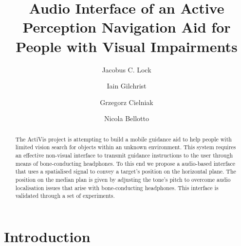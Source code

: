 \documentclass{llncs}
\begin{document}
\title{Audio Interface of an Active Perception Navigation Aid for People with Visual Impairments}

\author{Jacobus C. Lock \and 
Iain Gilchrist \and
Grzegorz Cielniak \and
Nicola Bellotto}



\maketitle
\setcounter{footnote}{0}

\begin{abstract}
  The ActiVis project is attempting to build a mobile guidance aid to help people with limited vision search for objects within an unknown environment.
  This system requires an effective non-visual interface to transmit guidance instructions to the user through means of bone-conducting headphones.
  To this end we propose a audio-based interface that uses a spatialised signal to convey a target's position on the horizontal plane. 
  The position on the median plan is given by adjusting the tone's pitch to overcome audio localisation issues that arise with bone-conducting headphones. 
  This interface is validated through a set of experiments. 
\end{abstract} 

\section{Introduction}
\end{document}
